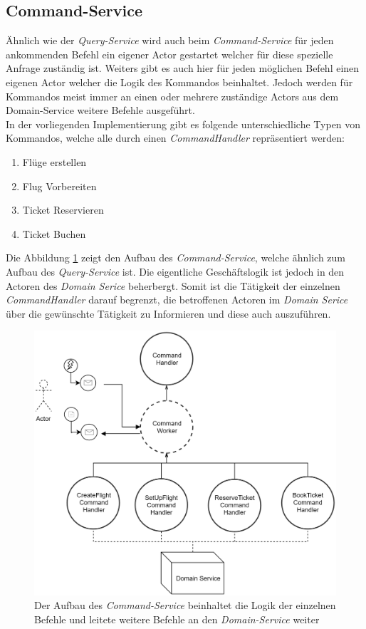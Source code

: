 \subsection{Command-Service}
\label{subsec:implementation:commandService}
 Ähnlich wie der \textit{Query-Service} wird auch beim \textit{Command-Service} für jeden ankommenden Befehl ein eigener Actor gestartet welcher für diese spezielle Anfrage zuständig ist. Weiters gibt es auch hier für jeden möglichen Befehl einen eigenen Actor welcher die Logik des Kommandos beinhaltet. Jedoch werden für Kommandos meist immer an einen oder mehrere zuständige Actors aus dem Domain-Service weitere Befehle ausgeführt. \\
 In der vorliegenden Implementierung gibt es folgende unterschiedliche Typen von Kommandos, welche alle durch einen \textit{CommandHandler} repräsentiert werden:
 \begin{enumerate}
     \item Flüge erstellen
     \item Flug Vorbereiten
     \item Ticket Reservieren
     \item Ticket Buchen
 \end{enumerate}
Die Abbildung \ref{fig:implementation:commandActorModel} zeigt den Aufbau des \textit{Command-Service}, welche ähnlich zum Aufbau des \textit{Query-Service} ist. Die eigentliche Geschäftslogik ist jedoch in den Actoren des \textit{Domain Serice} beherbergt. Somit ist die Tätigkeit der einzelnen \textit{CommandHandler} darauf begrenzt, die betroffenen Actoren im \textit{Domain Serice} über die gewünschte Tätigkeit zu Informieren und diese auch auszuführen. 
 \begin{figure}
    \centering
    \includegraphics[width=0.8\linewidth]{gfx/implementation/CommandServiceActorModel}
    \caption{Der Aufbau des \textit{Command-Service} beinhaltet die Logik der einzelnen Befehle und leitete weitere Befehle an den \textit{Domain-Service} weiter }
    \label{fig:implementation:commandActorModel}
\end{figure} 


